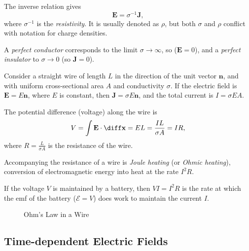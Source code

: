 \documentclass[12pt]{article}
\begin{document}
The inverse relation gives
\[
\mathbf{E} = \sigma^{-1} \mathbf{J}
,\]
where $\sigma^{-1}$ is the \emph{resistivity}. It is usually denoted as $\rho$, but both $\sigma$ and $\rho$ conflict with notation for charge densities.

A \emph{perfect conductor} corresponds to the limit $\sigma \to \infty$, so ($\mathbf{E} = 0$), and a \emph{perfect insulator}  to $\sigma \to 0$ (so $\mathbf{J} = 0$).

\begin{exbox}
	Consider a straight wire of length $L$ in the direction of the unit vector $\mathbf{n}$, and with uniform cross-sectional area $A$ and conductivity $\sigma$. If the electric field is $\mathbf{E} = E \mathbf{n}$, where $E$ is constant, then $\mathbf{J} = \sigma E \mathbf{n}$, and the total current is $I = \sigma E A$.

	The potential difference (voltage) along the wire is
	\[
	V = \int \mathbf{E} \cdot \diff \mathbf{x} = EL = \frac{IL}{\sigma A} = IR
	,\]
	where $R=  \frac{L}{\sigma A}$ is the resistance of the wire.

	Accompanying the resistance of a wire is \emph{Joule heating} (or \emph{Ohmic heating}), conversion of electromagnetic energy into heat at the rate $I^2R$.

	If the voltage $V$ is maintained by a battery, then $VI = I^2R$ is the rate at which the emf of the battery ($\mathcal{E} = V$) does work to maintain the current $I$.
\end{exbox}

\begin{figure}[h]
	\centering
	\caption{Ohm's Law in a Wire}
	\label{fig:ohm_wire}
\end{figure}

\subsection{Time-dependent Electric Fields}
\label{sub:time_dependent_electric_fields}
\end{document}
